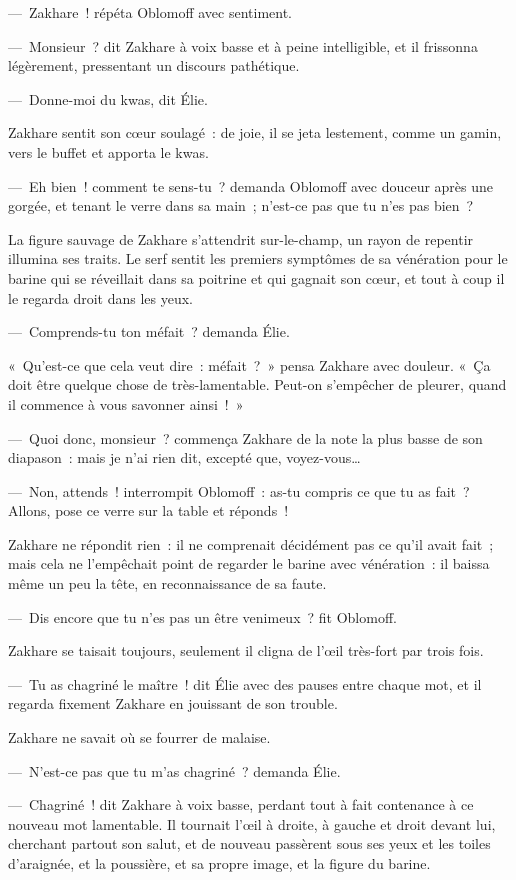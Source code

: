 \documentclass[french,twoside]{book} %
\begin{document}
— Zakhare ! répéta Oblomoff avec sentiment.\par
— Monsieur ? dit Zakhare à voix basse et à peine intelligible, et il frissonna légèrement, pressentant un discours pathétique.\par
— Donne-moi du kwas, dit Élie.\par
Zakhare sentit son cœur soulagé : de joie, il se jeta lestement, comme un gamin, vers le buffet et apporta le kwas.\par
— Eh bien ! comment te sens-tu ? demanda Oblomoff avec douceur après une gorgée, et tenant le verre dans sa main ; n’est-ce pas que tu n’es pas bien ?\par
La figure sauvage de Zakhare s’attendrit sur-le-champ, un rayon de repentir illumina ses traits. Le serf sentit les premiers symptômes de sa vénération pour le barine qui se réveillait dans sa poitrine et qui gagnait son cœur, et tout à coup il le regarda droit dans les yeux.\par
— Comprends-tu ton méfait ? demanda Élie.\par
« Qu’est-ce que cela veut dire : méfait ? » pensa Zakhare avec douleur. « Ça doit être quelque chose de très-lamentable. Peut-on s’empêcher de pleurer, quand il commence à vous savonner ainsi ! »\par
— Quoi donc, monsieur ? commença Zakhare de la note la plus basse de son diapason : mais je n’ai rien dit, excepté que, voyez-vous…\par
— Non, attends ! interrompit Oblomoff : as-tu compris ce que tu as fait ? Allons, pose ce verre sur la table et réponds !\par
Zakhare ne répondit rien : il ne comprenait décidément pas ce qu’il avait fait ; mais cela ne l’empêchait point de regarder le barine avec vénération : il baissa même un peu la tête, en reconnaissance de sa faute.\par
— Dis encore que tu n’es pas un être venimeux ? fit Oblomoff.\par
Zakhare se taisait toujours, seulement il cligna de l’œil très-fort par trois fois.\par
— Tu as chagriné le maître ! dit Élie avec des pauses entre chaque mot, et il regarda fixement Zakhare en jouissant de son trouble.\par
Zakhare ne savait où se fourrer de malaise.\par
— N’est-ce pas que tu m’as chagriné ? demanda Élie.\par
— Chagriné ! dit Zakhare à voix basse, perdant tout à fait contenance à ce nouveau mot lamentable. Il tournait l’œil à droite, à gauche et droit devant lui, cherchant partout son salut, et de nouveau passèrent sous ses yeux et les toiles d’araignée, et la poussière, et sa propre image, et la figure du barine.\par
\end{document}
